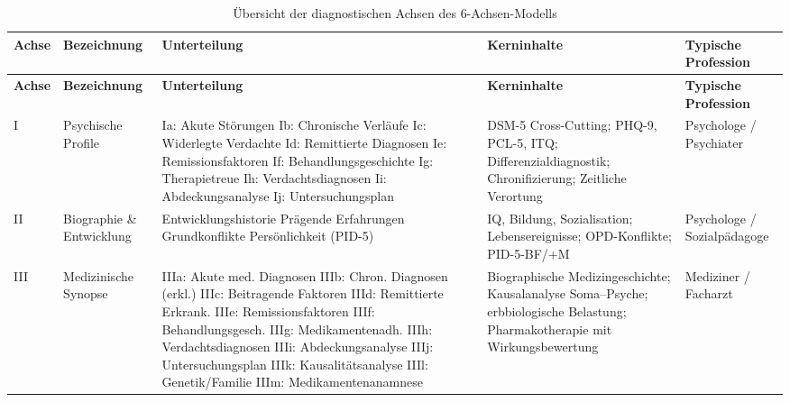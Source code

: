 \documentclass[11pt,a4paper]{article}
\begin{document}
\begin{longtable}{p{0.8cm}p{2.2cm}p{3.8cm}p{4cm}p{2cm}}
\caption{\"Ubersicht der diagnostischen Achsen des 6-Achsen-Modells} \label{tab:achsen} \\
\toprule
\textbf{Achse} & \textbf{Bezeichnung} & \textbf{Unterteilung} & \textbf{Kerninhalte} & \textbf{Typische Profession} \\
\midrule
\endfirsthead
\toprule
\textbf{Achse} & \textbf{Bezeichnung} & \textbf{Unterteilung} & \textbf{Kerninhalte} & \textbf{Typische Profession} \\
\midrule
\endhead
I & Psychische Profile & Ia: Akute St\"orungen \newline Ib: Chronische Verl\"aufe \newline Ic: Widerlegte Verdachte \newline Id: Remittierte Diagnosen \newline Ie: Remissionsfaktoren \newline If: Behandlungsgeschichte \newline Ig: Therapietreue \newline Ih: Verdachtsdiagnosen \newline Ii: Abdeckungsanalyse \newline Ij: Untersuchungsplan & DSM-5 Cross-Cutting; PHQ-9, PCL-5, ITQ; Differenzialdiagnostik; Chronifizierung; Zeitliche Verortung & Psychologe / Psychiater \\
\addlinespace
II & Biographie \& Entwicklung & Entwicklungshistorie \newline Pr\"agende Erfahrungen \newline Grundkonflikte \newline Pers\"onlichkeit (PID-5) & IQ, Bildung, Sozialisation; Lebensereignisse; OPD-Konflikte; PID-5-BF/+M & Psychologe / Sozialp\"adagoge \\
\addlinespace
III & Medizinische Synopse & IIIa: Akute med. Diagnosen \newline IIIb: Chron. Diagnosen (erkl.) \newline IIIc: Beitragende Faktoren \newline IIId: Remittierte Erkrank. \newline IIIe: Remissionsfaktoren \newline IIIf: Behandlungsgesch. \newline IIIg: Medikamentenadh. \newline IIIh: Verdachtsdiagnosen \newline IIIi: Abdeckungsanalyse \newline IIIj: Untersuchungsplan \newline IIIk: Kausalit\"atsanalyse \newline IIIl: Genetik/Familie \newline IIIm: Medikamenten\-anamnese & Biographische Medizin\-geschichte; Kausal\-analyse Soma--Psyche; erbbiologische Belastung; Pharmako\-therapie mit Wirkungs\-bewertung & Mediziner / Facharzt \\

\end{longtable}
\end{document}
